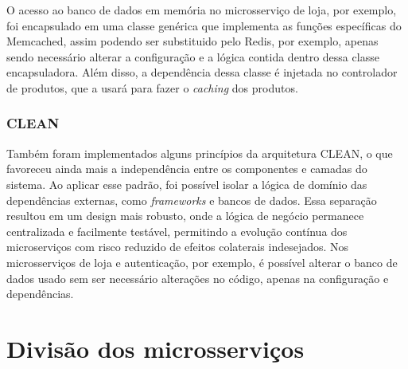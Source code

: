 O acesso ao banco de dados em memória no microsserviço de loja, por exemplo, foi encapsulado em uma classe genérica que implementa as funções específicas do Memcached, assim podendo ser substituido pelo Redis, por exemplo, apenas sendo necessário alterar a configuração e a lógica contida dentro dessa classe encapsuladora. Além disso, a dependência dessa classe é injetada no controlador de produtos, que a usará para fazer o \emph{caching} dos produtos.


\subsubsection*{CLEAN}
Também foram implementados alguns princípios da arquitetura CLEAN, o que favoreceu ainda mais a independência entre os componentes e camadas do sistema. Ao aplicar esse padrão, foi possível isolar a lógica de domínio das dependências externas, como \emph{frameworks} e bancos de dados. Essa separação resultou em um design mais robusto, onde a lógica de negócio permanece centralizada e facilmente testável, permitindo a evolução contínua dos microserviços com risco reduzido de efeitos colaterais indesejados.
Nos microsserviços de loja e autenticação, por exemplo, é possível alterar o banco de dados usado sem ser necessário alterações no código, apenas na configuração e dependências.



\section{Divisão dos microsserviços}

